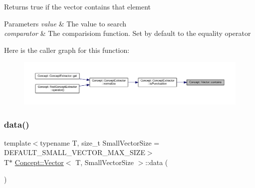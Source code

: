 \begin{DoxyReturn}{Returns}
true if the vector contains that element 
\end{DoxyReturn}

\begin{DoxyParams}{Parameters}
{\em value} & The value to search \\
\hline
{\em comparator} & The comparisiom function. Set by default to the equality operator \\
\hline
\end{DoxyParams}
Here is the caller graph for this function\+:\nopagebreak
\begin{figure}[H]
\begin{center}
\leavevmode
\includegraphics[width=350pt]{class_concept_1_1_vector_a17d62b0ccb0f1cceb78748c44f625269_icgraph}
\end{center}
\end{figure}
\mbox{\label{class_concept_1_1_vector_a37d79a7609e4493dd0c10ab5948914ec}} 
\subsubsection{\texorpdfstring{data()}{data()}\hspace{0.1cm}{\footnotesize\ttfamily [1/2]}}
{\footnotesize\ttfamily template$<$typename T, size\+\_\+t Small\+Vector\+Size = D\+E\+F\+A\+U\+L\+T\+\_\+\+S\+M\+A\+L\+L\+\_\+\+V\+E\+C\+T\+O\+R\+\_\+\+M\+A\+X\+\_\+\+S\+I\+ZE$>$ \\
T$\ast$ \mbox{\hyperlink{class_concept_1_1_vector}{Concept\+::\+Vector}}$<$ T, Small\+Vector\+Size $>$\+::data (\begin{DoxyParamCaption}{ }\end{DoxyParamCaption})\hspace{0.3cm}{\ttfamily [inline]}}

